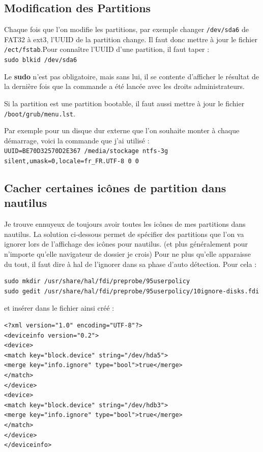 \documentclass[a4paper,twoside]{article}
\begin{document}
\subsection{Modification des Partitions}
Chaque fois que l'on modifie les partitions, par exemple changer \verb|/dev/sda6| de FAT32 à ext3, l'UUID de la partition change. Il faut donc mettre à jour le fichier \verb|/ect/fstab|.Pour connaître l'UUID d'une partition, il faut taper :\\
\verb|sudo blkid /dev/sda6|

\begin{remarque}
Le \textbf{sudo} n'est pas obligatoire, mais sans lui, il se contente d'afficher le résultat de la dernière fois que la commande a été lancée avec les droits administrateurs.
\end{remarque}

Si la partition est une partition bootable, il faut aussi mettre à jour le fichier \verb|/boot/grub/menu.lst|.

Par exemple pour un disque dur externe que l'on souhaite monter à chaque démarrage, voici la commande que j'ai utilisé :\\
\verb|UUID=BE70D32570D2E367 /media/stockage ntfs-3g silent,umask=0,locale=fr_FR.UTF-8 0 0|

\subsection{Cacher certaines icônes de partition dans nautilus}
Je trouve ennuyeux de toujours avoir toutes les icônes de mes partitions dans nautilus. La solution ci-dessous permet de spécifier des partitions que l'on va ignorer lors de l'affichage des icônes pour nautilus. (et plus généralement pour n'importe qu'elle navigateur de dossier je crois) Pour ne plus qu'elle apparaisse du tout, il faut dire à hal de l'ignorer dans sa phase d'auto détection. Pour cela :


\begin{verbatim}
sudo mkdir /usr/share/hal/fdi/preprobe/95userpolicy
sudo gedit /usr/share/hal/fdi/preprobe/95userpolicy/10ignore-disks.fdi
\end{verbatim}

et insérer dans le fichier ainsi créé :

\begin{verbatim}
<?xml version="1.0" encoding="UTF-8"?>
<deviceinfo version="0.2">
<device>
<match key="block.device" string="/dev/hda5">
<merge key="info.ignore" type="bool">true</merge>
</match>
</device>
<device>
<match key="block.device" string="/dev/hdb3">
<merge key="info.ignore" type="bool">true</merge>
</match>
</device>
</deviceinfo>
\end{verbatim}
\end{document}
